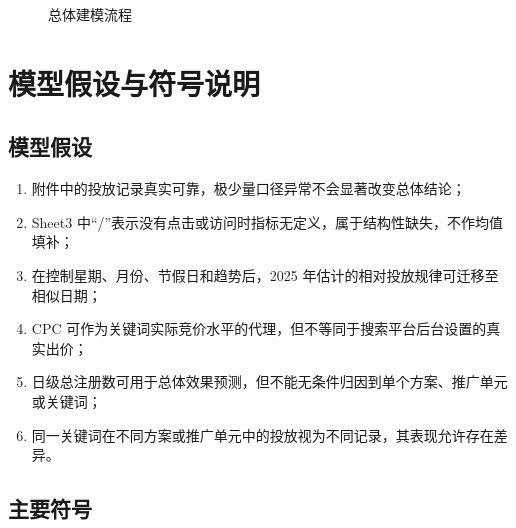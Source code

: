 \documentclass[UTF8,a4paper,zihao=-4]{ctexart}
\begin{document}
\begin{figure}[H]
  \centering
  \caption{总体建模流程}
  \label{fig:route}
\end{figure}

\section{模型假设与符号说明}

\subsection{模型假设}

\begin{enumerate}
  \item 附件中的投放记录真实可靠，极少量口径异常不会显著改变总体结论；
  \item Sheet3 中“/”表示没有点击或访问时指标无定义，属于结构性缺失，不作均值填补；
  \item 在控制星期、月份、节假日和趋势后，2025 年估计的相对投放规律可迁移至相似日期；
  \item CPC 可作为关键词实际竞价水平的代理，但不等同于搜索平台后台设置的真实出价；
  \item 日级总注册数可用于总体效果预测，但不能无条件归因到单个方案、推广单元或关键词；
  \item 同一关键词在不同方案或推广单元中的投放视为不同记录，其表现允许存在差异。
\end{enumerate}

\subsection{主要符号}
\end{document}
